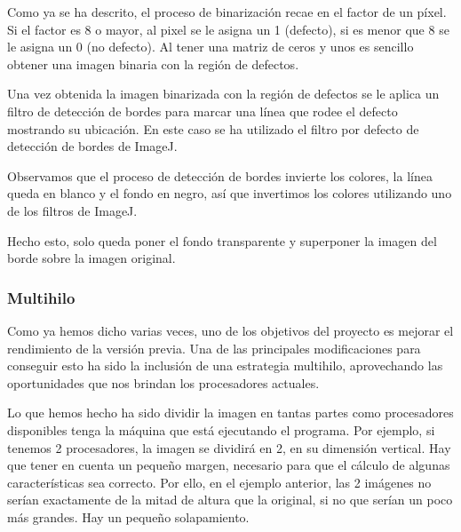 Como ya se ha descrito, el proceso de binarización recae en el factor de un píxel. Si el factor es 8 o mayor, al pixel se le asigna un 1 (defecto), si es menor que 8 se le asigna un 0 (no defecto). Al tener una matriz de ceros y unos es sencillo obtener una imagen binaria con la región de defectos.


Una vez obtenida la imagen binarizada con la región de defectos se le aplica un filtro de detección de bordes para marcar una línea que rodee el defecto mostrando su ubicación. En este caso se ha utilizado el filtro por defecto de detección de bordes de ImageJ.

Observamos que el proceso de detección de bordes invierte los colores, la línea queda en blanco y el fondo en negro, así que invertimos los colores utilizando uno de los filtros de ImageJ.

Hecho esto, solo queda poner el fondo transparente y superponer la imagen del borde sobre la imagen original.

\subsubsection{Multihilo}
Como ya hemos dicho varias veces, uno de los objetivos del proyecto es mejorar el rendimiento de la versión previa. Una de las principales modificaciones para conseguir esto ha sido la inclusión de una estrategia multihilo, aprovechando las oportunidades que nos brindan los procesadores actuales.

Lo que hemos hecho ha sido dividir la imagen en tantas partes como procesadores disponibles tenga la máquina que está ejecutando el programa. Por ejemplo, si tenemos 2 procesadores, la imagen se dividirá en 2, en su dimensión vertical. Hay que tener en cuenta un pequeño margen, necesario para que el cálculo de algunas características sea correcto. Por ello, en el ejemplo anterior, las 2 imágenes no serían exactamente de la mitad de altura que la original, si no que serían un poco más grandes. Hay un pequeño solapamiento.

